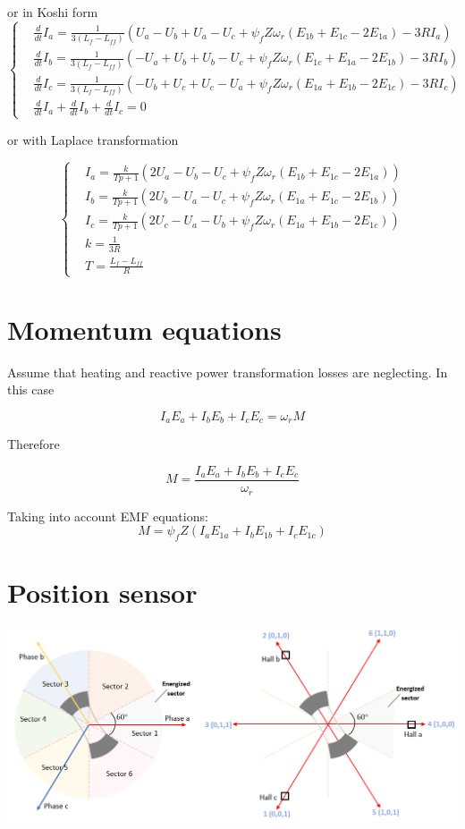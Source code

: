 \documentclass[11pt,a4paper,oneside]{report}
\begin{document}
or in Koshi form
\begin{equation}
	\left\{
	\begin{split}
		&\frac{d}{dt}I_a=\frac{1}{3(L_f-L_{ff})}\left(U_a-U_b+U_a-U_c+\psi_fZ\omega_r(E_{1b}+E_{1c}-2E_{1a})-3RI_a\right)\\
		&\frac{d}{dt}I_b=\frac{1}{3(L_f-L_{ff})}\left(-U_a+U_b+U_b-U_c+\psi_fZ\omega_r(E_{1c}+E_{1a}-2E_{1b})-3RI_b\right)\\
		&\frac{d}{dt}I_c=\frac{1}{3(L_f-L_{ff})}\left(-U_b+U_c+U_c-U_a+\psi_fZ\omega_r(E_{1a}+E_{1b}-2E_{1c})-3RI_c\right)\\
		&\frac{d}{dt}I_a+\frac{d}{dt}I_b+\frac{d}{dt}I_c=0
	\end{split}
\right.
\end{equation}

or with Laplace transformation

\begin{equation}
	\left\{
	\begin{split}
		&I_a=\frac{k}{Tp+1}\left(2U_a-U_b-U_c+\psi_fZ\omega_r(E_{1b}+E_{1c}-2E_{1a})\right)\\
		&I_b=\frac{k}{Tp+1}\left(2U_b-U_a-U_c+\psi_fZ\omega_r(E_{1a}+E_{1c}-2E_{1b})\right)\\
		&I_c=\frac{k}{Tp+1}\left(2U_c-U_a-U_b+\psi_fZ\omega_r(E_{1a}+E_{1b}-2E_{1c})\right)\\
		& k=\frac{1}{3R}\\
		& T=\frac{L_f-L_{ff}}{R}
	\end{split}
	\right.
\end{equation}

\section{Momentum equations}

Assume that heating and reactive power transformation losses are neglecting. In this case

\begin{equation}
	I_aE_a+I_bE_b+I_cE_c=\omega_rM
\end{equation}

Therefore

\begin{equation}
	M=\frac{I_aE_a+I_bE_b+I_cE_c}{\omega_r}
\end{equation}

Taking into account EMF equations:
\begin{equation}
	M=\psi_fZ(I_aE_{1a}+I_bE_{1b}+I_cE_{1c})
\end{equation}

\section{Position sensor}

\begin{center}
	\includegraphics[scale=0.5]{sensor}
\end{center}
\end{document}
